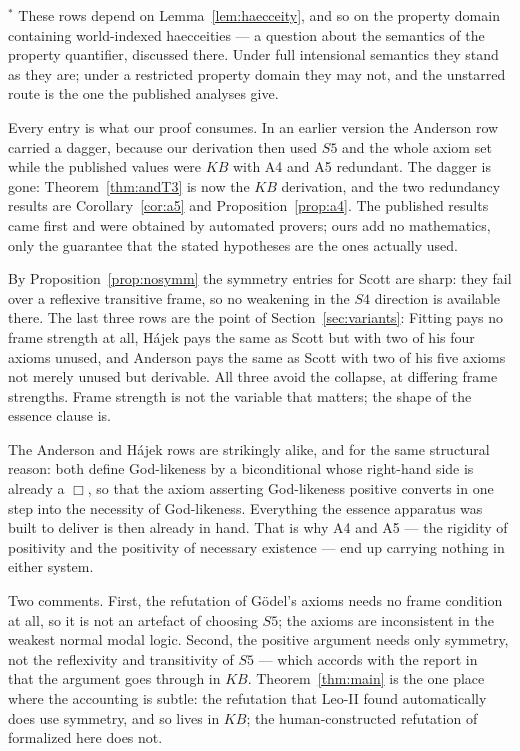 \documentclass[11pt]{article}
\theoremstyle{plain}
\theoremstyle{definition}
\begin{document}
\noindent
$^{\ast}$ These rows depend on Lemma~\ref{lem:haecceity}, and so on the
property domain containing world-indexed haecceities --- a question about the
semantics of the property quantifier, discussed there. Under full intensional
semantics they stand as they are; under a restricted property domain they may
not, and the unstarred route is the one the published analyses give.

Every entry is what our proof consumes. In an earlier version the Anderson row
carried a dagger, because our derivation then used $S5$ and the whole axiom set
while the published values were $KB$ with A4 and A5 redundant. The dagger is
gone: Theorem~\ref{thm:andT3} is now the $KB$ derivation, and the two
redundancy results are Corollary~\ref{cor:a5} and Proposition~\ref{prop:a4}.
The published results came first and were obtained by automated provers; ours
add no mathematics, only the guarantee that the stated hypotheses are the ones
actually used.

By Proposition~\ref{prop:nosymm} the symmetry entries for Scott are sharp: they
fail over a reflexive transitive frame, so no weakening in the $S4$ direction
is available there. The last three rows are the point of
Section~\ref{sec:variants}: Fitting pays no frame strength at all, H\'ajek pays
the same as Scott but with two of his four axioms unused, and Anderson pays the
same as Scott with two of his five axioms not merely unused but derivable. All
three avoid the collapse, at differing frame strengths. Frame strength is not
the variable that matters; the shape of the essence clause is.

The Anderson and H\'ajek rows are strikingly alike, and for the same structural
reason: both define God-likeness by a biconditional whose right-hand side is
already a $\Box$, so that the axiom asserting God-likeness positive converts in
one step into the necessity of God-likeness. Everything the essence apparatus
was built to deliver is then already in hand. That is why A4 and A5 --- the
rigidity of positivity and the positivity of necessary existence --- end up
carrying nothing in either system.

\noindent
Two comments. First, the refutation of G\"odel's axioms needs no frame
condition at all, so it is not an artefact of choosing $S5$; the axioms are
inconsistent in the weakest normal modal logic. Second, the positive argument
needs only symmetry, not the reflexivity and transitivity of $S5$ --- which
accords with the report in~\cite{bwp2016} that the argument goes through in
$KB$. Theorem~\ref{thm:main} is the one place where the accounting is subtle:
the refutation that Leo-II found automatically does use symmetry, and so lives
in $KB$; the human-constructed refutation of~\cite{bwp2016} formalized here
does not.
\end{document}
